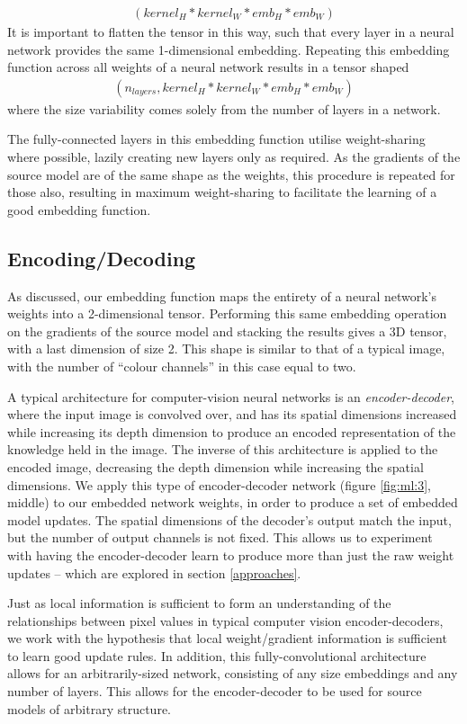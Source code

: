 \documentclass{report}
\begin{document}
\begin{align}
(kernel_{H}*kernel_{W}*emb_H*emb_W)
\end{align}
It is important to flatten the tensor in this way, such that every layer in a neural network provides the same 1-dimensional embedding. Repeating this embedding function across all weights of a neural network results in a tensor shaped 
\begin{align}
(n_{layers}, kernel_{H}*kernel_{W}*emb_H*emb_W)
\end{align}
where the size variability comes solely from the number of layers in a network. \par
The fully-connected layers in this embedding function utilise weight-sharing where possible, lazily creating new layers only as required. As the gradients of the source model are of the same shape as the weights, this procedure is repeated for those also, resulting in maximum weight-sharing to facilitate the learning of a good embedding function. \par

\subsection{Encoding/Decoding}
As discussed, our embedding function maps the entirety of a neural network's weights into a 2-dimensional tensor. Performing this same embedding operation on the gradients of the source model and stacking the results gives a 3D tensor, with a last dimension of size 2. This shape is similar to that of a typical image, with the number of ``colour channels'' in this case equal to two. \par
A typical architecture for computer-vision neural networks is an \textit{encoder-decoder}, where the input image is convolved over, and has its spatial dimensions increased while increasing its depth dimension to produce an encoded representation of the knowledge held in the image. The inverse of this architecture is applied to the encoded image, decreasing the depth dimension while increasing the spatial dimensions. We apply this type of encoder-decoder network (figure \ref{fig:ml:3}, middle) to our embedded network weights, in order to produce a set of embedded model updates. The spatial dimensions of the decoder's output match the input, but the number of output channels is not fixed. This allows us to experiment with having the encoder-decoder learn to produce more than just the raw weight updates -- which are explored in section \ref{approaches}. \par
Just as local information is sufficient to form an understanding of the relationships between pixel values in typical computer vision encoder-decoders, we work with the hypothesis that local weight/gradient information is sufficient to learn good update rules. In addition, this fully-convolutional architecture allows for an arbitrarily-sized network, consisting of any size embeddings and any number of layers. This allows for the encoder-decoder to be used for source models of arbitrary structure. \par
\end{document}
